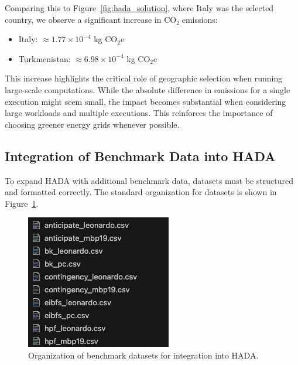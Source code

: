 \documentclass[a4paper,singleside,12pt]{report} %
\begin{document}
Comparing this to Figure~\ref{fig:hada_solution}, where Italy was the selected country, we observe a significant increase in CO₂ emissions:

\begin{itemize}
    \item Italy: $\approx 1.77 \times 10^{-4}$ kg CO$_2$e
    \item Turkmenistan: $\approx 6.98 \times 10^{-4}$ kg CO$_2$e
\end{itemize}

This increase highlights the critical role of geographic selection when running large-scale computations. While the absolute difference in emissions for a single execution might seem 
small, the impact becomes substantial when considering large workloads and multiple executions. This reinforces the importance of choosing greener energy grids whenever possible.

\subsection{Integration of Benchmark Data into HADA}

To expand HADA with additional benchmark data, datasets must be structured and formatted correctly. The standard organization for datasets is shown in Figure~\ref{fig:datasets_organization}.

\begin{figure}[h!]
    \centering
    \includegraphics[width=0.8\linewidth]{imgs/benchmark-datasets.png}
    \caption{Organization of benchmark datasets for integration into HADA.}
    \label{fig:datasets_organization}
\end{figure}
\end{document}

